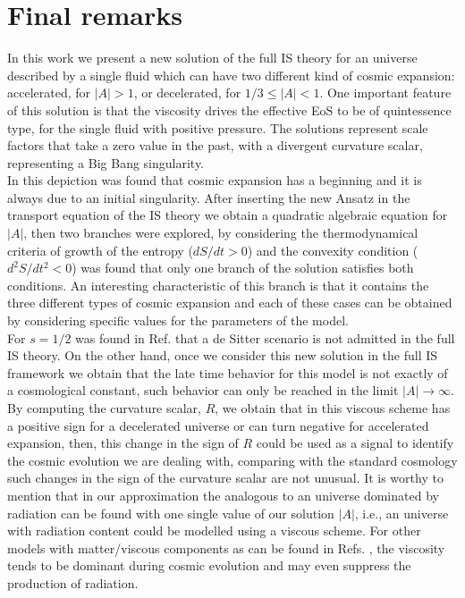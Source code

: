 \documentclass[twocolumn,showpacs,nofootinbib,floats,amsmath,amssymb]{revtex4}
\begin{document}
\section{Final remarks} 
\label{sec:elfinal}
In this work we present a new solution of the full IS theory for an universe described by a single fluid which can have two different kind of cosmic expansion: accelerated, for $\left|A\right| > 1$, or decelerated, for $ 1/3 \leq \left|A\right| < 1$. One important feature of this solution is that the viscosity drives the effective EoS to be of quintessence type, for the single fluid with positive pressure. The solutions represent scale factors that take a zero value in the past, with a divergent curvature scalar, representing a Big Bang singularity.\\ 

In this depiction was found that cosmic expansion has a beginning and it is always due to an initial singularity. After inserting the new Ansatz in the transport equation of the IS theory we obtain a quadratic algebraic equation for $\left|A\right|$, then two branches were explored, by considering the thermodynamical criteria of growth of the entropy ($dS/dt > 0$) and the convexity condition ($d^{2}S/dt^{2} < 0$) was found that only one branch of the solution satisfies both conditions. An interesting characteristic of this branch is that it contains the three different types of cosmic expansion and each of these cases can be obtained by considering specific values ​​for the parameters of the model.\\ 

For $s=1/2$ was found in Ref. \cite{CruzLepe} that a de Sitter scenario is not admitted in the full IS theory. On the other hand, once we consider this new solution in the full IS framework we obtain that the late time behavior for this model is not exactly of a cosmological constant, such behavior can only be reached in the limit $\left|A\right|\rightarrow \infty$. By computing the curvature scalar, $R$, we obtain that in this viscous scheme has a positive sign for a decelerated universe or can turn negative for accelerated expansion, then, this change in the sign of $R$ could be used as a signal to identify the cosmic evolution we are dealing with, comparing with the standard cosmology such changes in the sign of the curvature scalar are not unusual. %
It is worthy to mention that in our approximation the analogous to an universe dominated by radiation can be found with one single value of our solution $\left|A\right|$, i.e., an universe with radiation content could be modelled using a viscous scheme. For other models with matter/viscous components as can be found in Refs. \cite{rad1, rad2}, the viscosity tends to be dominant during cosmic evolution and may even suppress the production of radiation.\\ 
\end{document}
